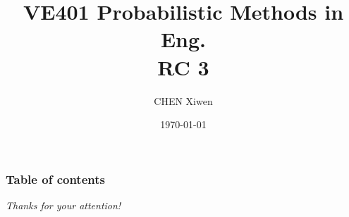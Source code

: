 \documentclass[11pt, hyperref={pdfpagelabels=true}]{beamer}
\title{VE401 Probabilistic Methods in Eng. \\RC 3}
\author{CHEN Xiwen}
\date{\today}
\institute[UM-JI]{UM-SJTU Joint Institute}
\begin{document}
\begin{frame}
\titlepage
\end{frame} 


\begin{frame}
\frametitle{Table of contents}
\tableofcontents
\end{frame} 



\begin{frame}{}

\centering
\emph{Thanks for your attention!}
  
  
\end{frame}
\end{document}
